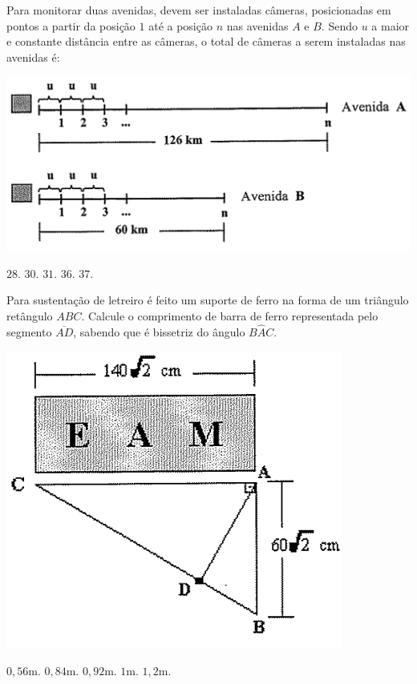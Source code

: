 \begin{question}%
Para monitorar duas avenidas, devem ser instaladas câmeras, posicionadas em pontos a partir da posição \(1\) até a posição \(n\) nas avenidas \(A\) e \(B\). Sendo \(u\) a maior e constante distância entre as câmeras, o total de câmeras a serem instaladas nas avenidas é:

    \centering
    \includegraphics[width=.3\textwidth]{CONCURSO/EAM/IMAGES/2004/EAM200409IMG.png}
    \begin{tasks}
        \task \(28\).
        \task \(30\).
        \task \(31\).
        \task \(36\).
        \task \(37\).
    \end{tasks}
\end{question}

\begin{question}%
Para sustentação de letreiro é feito um suporte de ferro na forma de um triângulo retângulo \(ABC\). Calcule o comprimento de barra de ferro representada pelo segmento \(\overline{AD}\), sabendo que é bissetriz do ângulo \(B\hat{A}C\).

    \centering
    \includegraphics[width=.3\textwidth]{CONCURSO/EAM/IMAGES/2004/EAM200410IMG.png}
    \begin{tasks}
        \task \(0,56\)m.
        \task \(0,84\)m.
        \task \(0,92\)m.
        \task \(1\)m.
        \task \(1,2\)m.
    \end{tasks}
\end{question}

